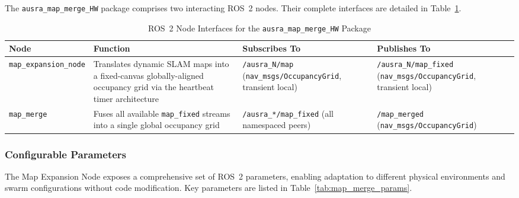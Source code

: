 \documentclass{article}
\begin{document}
The \texttt{ausra\_map\_merge\_HW} package comprises two interacting ROS~2 nodes. Their complete interfaces are detailed in Table~\ref{tab:map_merge_nodes}.

\begin{table}[H]
\centering
\small
\caption{ROS~2 Node Interfaces for the \texttt{ausra\_map\_merge\_HW} Package}
\label{tab:map_merge_nodes}
\begin{tabular}{|l|p{4cm}|p{4cm}|p{4cm}|}
\hline
\textbf{Node} & \textbf{Function} & \textbf{Subscribes To} & \textbf{Publishes To} \\
\hline
\texttt{map\_expansion\_node} & Translates dynamic SLAM maps into a fixed-canvas globally-aligned occupancy grid via the heartbeat timer architecture & \texttt{/ausra\_N/map} \newline (\texttt{nav\_msgs/OccupancyGrid}, transient local) & \texttt{/ausra\_N/map\_fixed} \newline (\texttt{nav\_msgs/OccupancyGrid}, transient local) \\
\hline
\texttt{map\_merge} & Fuses all available \texttt{map\_fixed} streams into a single global occupancy grid & \texttt{/ausra\_*/map\_fixed} \newline (all namespaced peers) & \texttt{/map\_merged} \newline (\texttt{nav\_msgs/OccupancyGrid}) \\
\hline
\end{tabular}
\end{table}

\subsubsection{Configurable Parameters}

The Map Expansion Node exposes a comprehensive set of ROS~2 parameters, enabling adaptation to different physical environments and swarm configurations without code modification. Key parameters are listed in Table~\ref{tab:map_merge_params}.
\end{document}
